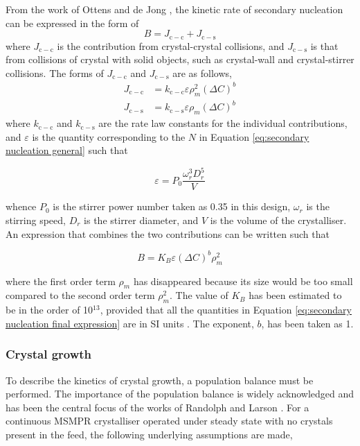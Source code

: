 From the work of Ottens and de Jong \cite{ottens_model_1974}, the kinetic rate of secondary nucleation can be expressed in the form of 
\begin{equation}
    B = J_{\mathrm{c-c}} + J_{\mathrm{c-s}}
\end{equation}
 where $J_{\mathrm{c-c}}$ is the contribution from crystal-crystal collisions, and $J_{\mathrm{c-s}}$ is that from collisions of crystal with solid objects, such as crystal-wall and crystal-stirrer collisions. The forms of $J_{\mathrm{c-c}}$ and $J_{\mathrm{c-s}}$ are as follows,
\begin{align}
    J_{\mathrm{c-c}} &= k_{\mathrm{c-c}} \varepsilon \rho_m^2 (\Delta C)^b \\
    J_{\mathrm{c-s}} &= k_{\mathrm{c-s}} \varepsilon \rho_m (\Delta C)^b
\end{align}
where $k_{\mathrm{c-c}}$ and $k_{\mathrm{c-s}}$ are the rate law constants for the individual contributions, and $\varepsilon$ is the quantity corresponding to the $N$ in Equation \ref{eq:secondary nucleation general} such that 

\begin{equation}
    \varepsilon = P_0 \frac{\omega_r^3 D_r^5}{V} 
\end{equation}

\noindent whence $P_0$ is the stirrer power number taken as 0.35 in this design, $\omega_r$ is the stirring speed, $D_r$ is the stirrer diameter, and $V$ is the volume of the crystalliser. An expression that combines the two contributions can be written such that 

\begin{equation} \label{eq:secondary nucleation final expression}
    B = K_B \varepsilon (\Delta C)^b \rho_m^2
\end{equation}

\noindent where the first order term $\rho_m$ has disappeared because its size would be too small compared to the second order term $\rho_m^2$. The value of $K_B$ has been estimated to be in the order of 10$^{13}$, provided that all the quantities in Equation \ref{eq:secondary nucleation final expression} are in SI units \cite{bauer_contact_1974}. The exponent, $b$, has been taken as 1. 

\subsubsection{Crystal growth} \label{sec: crystal growth}

To describe the kinetics of crystal growth, a population balance must be performed. The importance of the population balance is widely acknowledged and has been the central focus of the works of Randolph and Larson \cite{richardson_chemical_2006} \cite{randolph_theory_1971}. For a continuous MSMPR crystalliser operated under steady state with no crystals present in the feed, the following underlying assumptions are made,

